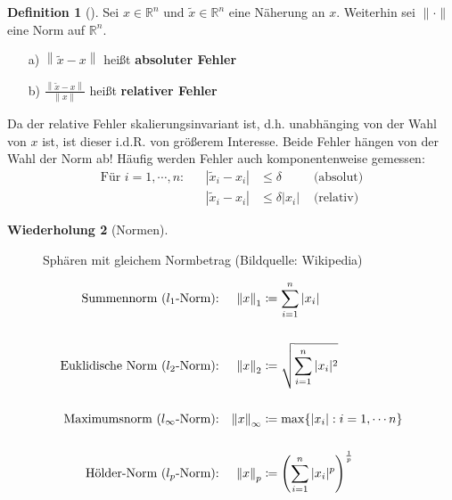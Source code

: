 \documentclass[ngerman,fontsize=11pt, paper=a4, parskip=half, titlepage=true, toc=bib]{scrbook}
\theoremstyle{definition}
\newtheorem{Def}{Definition}[section]		%
\newtheorem{Wdh}[Def]{Wiederholung}
\theoremstyle{plain}
\newcommand{\R}{\mathds{R}}
\newcommand{\nn}[1]{\left\| #1 \right\|}
\newcommand{\subsectione}[1]{\subsection{#1} \addtocounter{Def}{1}}
\newenvironment{Defe}[1][]{ %
	\begin{Def}[#1]
	}
	{
	\end{Def}
	\addtocounter{subsection}{1}
}
\newenvironment{Wdhe}[1][]{ %
	\begin{Wdh}[#1]
	}
	{
	\end{Wdh}
	\addtocounter{subsection}{1}
}
\begin{document}
\begin{Defe}
	\label{3.2.2} 
	Sei $x\in\R^n$ und $\widetilde{x} \in \R^n$ eine Näherung an $x$. Weiterhin sei $\|\cdot\|$ eine Norm auf $\R^n$.
	\begin{itemize}
		\item[a)] $\nn{\widetilde{x} - x}$ heißt \textbf{absoluter Fehler} 
		\item[b)] $\frac{\nn{\widetilde{x} - x}}{\nn{x}}$ heißt \textbf{relativer Fehler}
	\end{itemize}
	Da der relative Fehler skalierungsinvariant ist, d.h. unabhänging von der  Wahl von $x$ ist, ist dieser i.d.R. von größerem Interesse.
	Beide Fehler hängen von der Wahl der Norm ab!
	Häufig werden Fehler auch komponentenweise gemessen:
	\begin{align*}
	\text{Für } i=1,\cdots , n : && |\widetilde{x}_i - x_i | & \leq \delta & \text{ (absolut)} \\
	&& |\widetilde{x}_i - x_i | &\leq \delta |x_i| & \text{ (relativ)}
	\end{align*}
\end{Defe}


  \begin{Wdhe}[Normen]
  	\label{3.2.3}
  	\begin{figure}
  		\centering
 		\caption{Sphären mit gleichem Normbetrag (Bildquelle: Wikipedia)}
  	\end{figure}
  	
  	\begin{align*}
  	\text{Summennorm ($l_1$-Norm):} &&	\nn{x}_1 &\coloneqq \sum_{i=1}^{n}|x_i| 
  	\index{Norm!Summennorm}\\
  	\\
  	\text{Euklidische Norm ($l_2$-Norm):} &&	\nn{x}_2 &\coloneqq \sqrt{\sum_{i=1}^{n}|x_i|^2}
  	\index{Norm!Euklidische Norm} \\
  	\\
  	\text{Maximumsnorm ($l_\infty$-Norm):} &&\nn{x}_\infty &\coloneqq \max\{|x_i| : i=1, \cdots n\} \\
  	\index{Norm!Maximumsnorm}
  	\\
  	\text{Hölder-Norm ($l_p$-Norm):} &&	\nn{x}_p &\coloneqq 
  	\left(\sum_{i=1}^{n}|x_i|^p\right)^{\frac{1}{p}} 
  	\index{Norm!Hölder-Norm}
  	\end{align*}
  \end{Wdhe}
\end{document}

